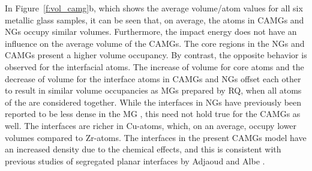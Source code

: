 \begin{selfcite}
In Figure~\ref{f:vol_camg}b, which shows the average volume/atom values for all six metallic glass samples, it can be seen that, on average, the atoms in CAMGs and NGs occupy similar volumes. Furthermore, the impact energy does not have an influence on the average volume of the CAMGs. The core regions in the NGs and CAMGs present a higher volume occupancy. By contrast, the opposite behavior is observed for the interfacial atoms. The increase of volume for core atoms and the decrease of volume for the interface atoms in CAMGs and NGs offset each other to result in similar volume occupancies as MGs prepared by RQ, when all atoms of the are considered together. While the interfaces in NGs have previously been reported to be less dense in the MG \cite{Sopu2009,Witte2013}, this need not hold true for the CAMGs as well. The interfaces are richer in Cu-atoms, which, on an average, occupy lower volumes compared to Zr-atoms. The interfaces in the present CAMGs model have an increased density due to the chemical effects, and this is consistent with previous studies of segregated planar interfaces by Adjaoud and Albe \cite{Adjaoud2016}.
\end{selfcite}